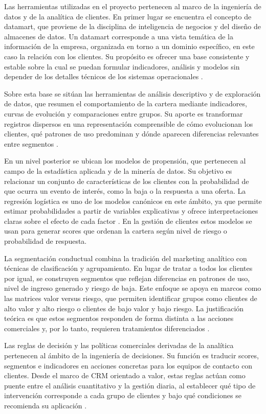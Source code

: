 Las herramientas utilizadas en el proyecto pertenecen al marco de la ingeniería de datos y de la analítica de clientes. En primer lugar se encuentra el concepto de datamart, que proviene de la disciplina de inteligencia de negocios y del diseño de almacenes de datos. Un datamart corresponde a una vista temática de la información de la empresa, organizada en torno a un dominio específico, en este caso la relación con los clientes. Su propósito es ofrecer una base consistente y estable sobre la cual se puedan formular indicadores, análisis y modelos sin depender de los detalles técnicos de los sistemas operacionales \citep{Kumar2010}.

Sobre esta base se sitúan las herramientas de análisis descriptivo y de exploración de datos, que resumen el comportamiento de la cartera mediante indicadores, curvas de evolución y comparaciones entre grupos. Su aporte es transformar registros dispersos en una representación comprensible de cómo evolucionan los clientes, qué patrones de uso predominan y dónde aparecen diferencias relevantes entre segmentos \citep{Kumar2010,Gupta2006}.

En un nivel posterior se ubican los modelos de propensión, que pertenecen al campo de la estadística aplicada y de la minería de datos. Su objetivo es relacionar un conjunto de características de los clientes con la probabilidad de que ocurra un evento de interés, como la baja o la respuesta a una oferta. La regresión logística es uno de los modelos canónicos en este ámbito, ya que permite estimar probabilidades a partir de variables explicativas y ofrece interpretaciones claras sobre el efecto de cada factor \citep{Hosmer2013}. En la gestión de clientes estos modelos se usan para generar scores que ordenan la cartera según nivel de riesgo o probabilidad de respuesta.

La segmentación conductual combina la tradición del marketing analítico con técnicas de clasificación y agrupamiento. En lugar de tratar a todos los clientes por igual, se construyen segmentos que reflejan diferencias en patrones de uso, nivel de ingreso generado y riesgo de baja. Este enfoque se apoya en marcos como las matrices valor versus riesgo, que permiten identificar grupos como clientes de alto valor y alto riesgo o clientes de bajo valor y bajo riesgo. La justificación teórica es que estos segmentos responden de forma distinta a las acciones comerciales y, por lo tanto, requieren tratamientos diferenciados \citep{Kumar2010,Gupta2006,SAS41683}.

Las reglas de decisión y las políticas comerciales derivadas de la analítica pertenecen al ámbito de la ingeniería de decisiones. Su función es traducir scores, segmentos e indicadores en acciones concretas para los equipos de contacto con clientes. Desde el marco de CRM orientado a valor, estas reglas actúan como puente entre el análisis cuantitativo y la gestión diaria, al establecer qué tipo de intervención corresponde a cada grupo de clientes y bajo qué condiciones se recomienda su aplicación \citep{Kumar2010}.

